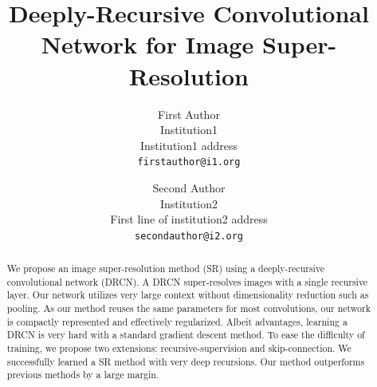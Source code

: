 \documentclass[10pt,twocolumn,letterpaper]{article}
\begin{document}


\title{Deeply-Recursive Convolutional Network for Image Super-Resolution}

\author{First Author\\
	Institution1\\
	Institution1 address\\
	{\tt\small firstauthor@i1.org}
	\and
	Second Author\\
	Institution2\\
	First line of institution2 address\\
	{\tt\small secondauthor@i2.org}
}

\maketitle



\begin{abstract}
We propose an image super-resolution method (SR) using a deeply-recursive convolutional network (DRCN). A DRCN super-resolves images with a single recursive layer. Our network utilizes very large context without dimensionality reduction such as pooling. As our method reuses the same parameters for most convolutions, our network is compactly represented and effectively regularized. Albeit advantages, learning a DRCN is very hard with a standard gradient descent method. To ease the difficulty of training, we propose two extensions: recursive-supervision and skip-connection. We successfully learned a SR method with very deep recursions. Our method outperforms previous methods by a large margin.
\end{abstract}
\end{document}
